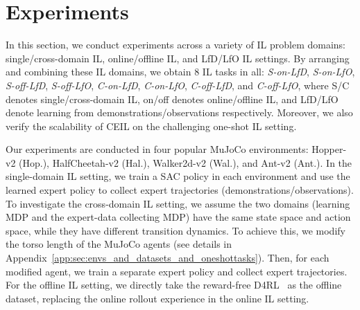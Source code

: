 

\section{Experiments}

In this section, we conduct experiments across a variety of IL problem domains: single/cross-domain IL, online/offline IL, and LfD/LfO IL settings. 
By arranging and combining these IL domains, we obtain 8 IL tasks in all: \textit{S-on-LfD}, \textit{S-on-LfO}, \textit{S-off-LfD}, \textit{S-off-LfO}, \textit{C-on-LfD}, \textit{C-on-LfO}, \textit{C-off-LfD}, and \textit{C-off-LfO}, where S/C denotes single/cross-domain IL, on/off denotes online/offline IL, and LfD/LfO denote learning from demonstrations/observations respectively. Moreover, we also verify the scalability of CEIL on the challenging one-shot IL setting. 


Our experiments are conducted in four popular MuJoCo environments: Hopper-v2 (Hop.), HalfCheetah-v2 (Hal.), Walker2d-v2 (Wal.), and Ant-v2 (Ant.). 
In the single-domain IL setting, we train a SAC policy in each environment and use the learned expert policy to collect expert trajectories (demonstrations/observations). 
To investigate the cross-domain IL setting, we assume the two domains (learning MDP and the expert-data collecting MDP) have the same state space and action space, while they have different transition dynamics. To achieve this, we modify the torso length of the MuJoCo agents (see details in Appendix~\ref{app:sec:envs_and_datasets_and_oneshottasks}). Then, for each modified agent, we train a separate expert policy and collect expert trajectories. 
For the offline IL setting, we directly take the reward-free D4RL~\citep{fu2020d4rl} as the offline dataset, replacing the online rollout experience in the online IL setting. 




